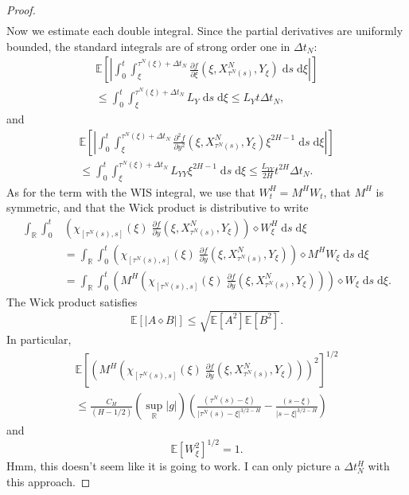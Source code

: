 \documentclass[reqno,12pt]{amsart}
\theoremstyle{plain}%
\theoremstyle{definition}
\begin{document}
\begin{proof}
\begin{equation}
\begin{aligned}
        \end{aligned}
    \end{equation}
    Now we estimate each double integral. Since the partial derivatives are uniformly bounded, the standard integrals are of strong order one in $\Delta t_N$:
    \begin{multline}
        \mathbb{E}\left[\left|\int_0^t \int_{\xi}^{\tau^N(\xi)+\Delta t_N} \frac{\partial f}{\partial \xi}(\xi, X_{\tau^N(s)}^N, Y_\xi) \;\mathrm{d}s\;\mathrm{d}\xi\right|\right] \\
        \leq \int_0^t \int_{\xi}^{\tau^N(\xi)+\Delta t_N} L_Y \;\mathrm{d}s\;\mathrm{d}\xi \leq L_Y t \Delta t_N,
    \end{multline}
    and
    \begin{multline}
        \mathbb{E}\left[\left|\int_0^t \int_{\xi}^{\tau^N(\xi)+\Delta t_N} \frac{\partial^2 f}{\partial y^2}(\xi, X_{\tau^N(s)}^N, Y_\xi) \xi^{2H - 1}\;\mathrm{d}s\;\mathrm{d}\xi\right|\right] \\
        \leq \int_0^t \int_{\xi}^{\tau^N(\xi)+\Delta t_N} L_{YY} \xi^{2H - 1}\;\mathrm{d}s\;\mathrm{d}\xi \leq \frac{L_{YY}}{2H} t^{2H} \Delta t_N.
    \end{multline}
    As for the term with the WIS integral, we use that $W_t^H = M^HW_t$, that $M^H$ is symmetric, and that the Wick product is distributive to write
    \begin{align*}
        \int_\mathbb{R} \int_0^t & \left(\chi_{[\tau^N(s), s]}(\xi)\;\frac{\partial f}{\partial y}(\xi, X_{\tau^N(s)}^N, Y_\xi) \right) \diamond W_\xi^H \;\mathrm{d}s \;\mathrm{d}\xi \\
        & = \int_\mathbb{R} \int_0^t \left(\chi_{[\tau^N(s), s]}(\xi)\;\frac{\partial f}{\partial y}(\xi, X_{\tau^N(s)}^N, Y_\xi) \right) \diamond M^H W_\xi \;\mathrm{d}s \;\mathrm{d}\xi \\
        & = \int_\mathbb{R} \int_0^t \left(M^H \left(\chi_{[\tau^N(s), s]}(\xi)\;\frac{\partial f}{\partial y}(\xi, X_{\tau^N(s)}^N, Y_\xi)\right) \right) \diamond W_\xi \;\mathrm{d}s \;\mathrm{d}\xi.
    \end{align*}
    The Wick product satisfies
    \[
        \mathbb{E}\left[\left|A \diamond B\right|\right] \leq \sqrt{\mathbb{E}\left[A^2\right]\mathbb{E}\left[B^2\right]}.
    \]
    In particular,
    \begin{multline*}
        \mathbb{E}\left[\left(M^H\left(\chi_{[\tau^N(s), s]}(\xi)\;\frac{\partial f}{\partial y}(\xi, X_{\tau^N(s)}^N, Y_\xi) \right)\right)^2\right]^{1/2} \\
        \leq \frac{C_H}{(H - 1/2)} (\sup_\mathbb{R} |g|) \left( \frac{(\tau^N(s) - \xi)}{|\tau^N(s) - \xi|^{3/2 - H}} - \frac{(s - \xi)}{|s - \xi|^{3/2 - H}}\right)
    \end{multline*}
    and
    \[
        \mathbb{E}\left[W_\xi^2\right]^{1/2} = 1.
    \]
    Hmm, this doesn't seem like it is going to work. I can only picture a $\Delta t_N^{H}$ with this approach.
\end{proof}
\end{document}
